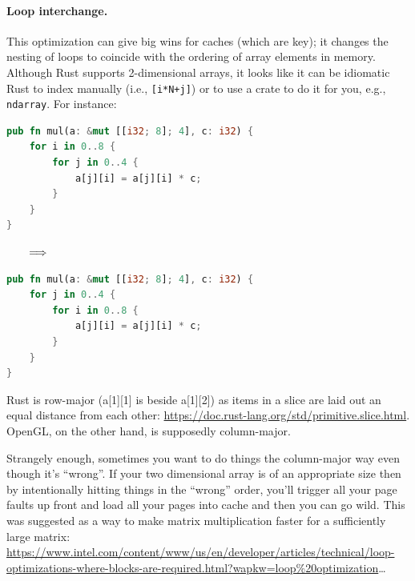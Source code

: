 \paragraph{Loop interchange.} This optimization can give big wins
for caches (which are key); it changes the nesting of loops to
coincide with the ordering of array elements in memory. Although Rust
supports 2-dimensional arrays, it looks like it can be idiomatic Rust to index
manually (i.e., \texttt{[i*N+j]}) or to use a crate to do it for you, e.g.,
\texttt{ndarray}.
For instance:
\begin{center}
\vspace*{-1em}
\begin{minipage}{.39\textwidth}
  \begin{lstlisting}[language=Rust]
pub fn mul(a: &mut [[i32; 8]; 4], c: i32) {
    for i in 0..8 {
        for j in 0..4 {
            a[j][i] = a[j][i] * c;
        }
    }
}
  \end{lstlisting}
  \end{minipage} $\hspace*{2em} \Longrightarrow \hspace*{2em}$ \begin{minipage}{.4\textwidth}
  \begin{lstlisting}[language=Rust]
pub fn mul(a: &mut [[i32; 8]; 4], c: i32) {
    for j in 0..4 {
        for i in 0..8 {
            a[j][i] = a[j][i] * c;
        }
    }
}
  \end{lstlisting}
  \end{minipage}
  \end{center}
  Rust is row-major (a[1][1] is beside a[1][2]) as items in a slice are laid out an equal distance from each other: {\scriptsize \url{https://doc.rust-lang.org/std/primitive.slice.html}}. OpenGL, on the other hand, is supposedly column-major.

Strangely enough, sometimes you want to do things the column-major way even though it's ``wrong''. If your two dimensional array is of an appropriate size then by intentionally hitting things in the ``wrong'' order, you'll trigger all your page faults up front and load all your pages into cache and then you can go wild. This was suggested as a way to make matrix multiplication faster for a sufficiently large matrix: {\scriptsize \url{https://www.intel.com/content/www/us/en/developer/articles/technical/loop-optimizations-where-blocks-are-required.html?wapkw=loop%20optimization}}\ldots

\newpage
